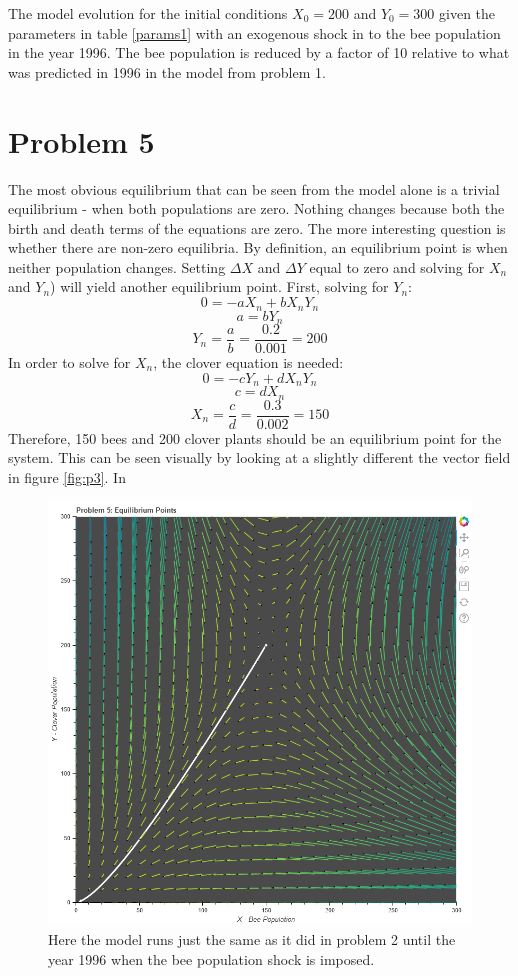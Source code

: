 \documentclass[12pt,a4paper,titlepage]{report}
\begin{document}
		\begin{table} 
			\centering
			
			\caption{The model evolution for the initial conditions \(X_{0} = 200\) and \(Y_{0} = 300\) given the parameters in table \ref{params1} with an exogenous shock in to the bee population in the year 1996. The bee population is reduced by a factor of 10 relative to what was predicted in 1996 in the model from problem 1.}
			\label{tab:p4}
		\end{table}
	
	\section*{Problem 5}
		The most obvious equilibrium that can be seen from the model alone is a trivial equilibrium - when both populations are zero. Nothing changes because both the birth and death terms of the equations are zero. The more interesting question is whether there are non-zero equilibria. By definition, an equilibrium point is when neither population changes. Setting \(\Delta X\) and \(\Delta Y\) equal to zero and solving for \(X_n\) and \(Y_n\)) will yield another equilibrium point. First, solving for \(Y_n\):  
		\[0 = -aX_{n} + b X_{n}Y_{n}\]
		\[a  = b Y_{n}\]
		\[Y_{n} = \frac{a}{b} = \frac{0.2}{0.001} = 200\]
		In order to solve for \(X_n\), the clover equation is needed:
		\[0 = -cY_{n} + d X_{n}Y_{n}\]
		\[c  = d X_{n}\]
		\[X_{n} = \frac{c}{d} = \frac{0.3}{0.002} = 150\]
		Therefore, 150 bees and 200 clover plants should be an equilibrium point for the system. This can be seen visually by looking at a slightly different the vector field in figure \ref{fig:p3}. In 
		\begin{figure}[htbp]
			\centerline{\includegraphics[scale=.5]{charts/problem5_chart.png}}
			\caption{Here the model runs just the same as it did in problem 2 until the year 1996 when the bee population shock is imposed.}
			\label{fig:p4}
		\end{figure}\\
\end{document}
